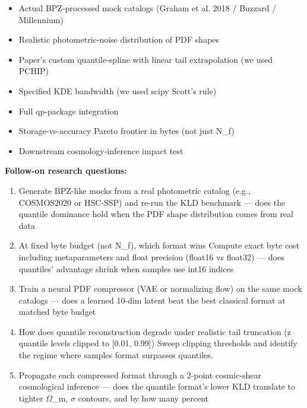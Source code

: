 \documentclass[11pt]{article}
\begin{document}
\begin{itemize}[leftmargin=1.4em,itemsep=0.2em,topsep=0.2em]
\item Actual BPZ-processed mock catalogs (Graham et al. 2018 / Buzzard / Millennium)
\item Realistic photometric-noise distribution of PDF shapes
\item Paper's custom quantile-spline with linear tail extrapolation (we used PCHIP)
\item Specified KDE bandwidth (we used scipy Scott's rule)
\item Full qp-package integration
\item Storage-vs-accuracy Pareto frontier in bytes (not just N\_f)
\item Downstream cosmology-inference impact test
\end{itemize}\noindent\textbf{Follow-on research questions:}
\begin{enumerate}[leftmargin=1.6em,itemsep=0.2em,topsep=0.2em,label=Q\arabic*.]
\item Generate BPZ-like mocks from a real photometric catalog (e.g., COSMOS2020 or HSC-SSP) and re-run the KLD benchmark --- does the quantile dominance hold when the PDF shape distribution comes from real data
\item At fixed byte budget (not N\_f), which format wins Compute exact byte cost including metaparameters and float precision (float16 vs float32) --- does quantiles' advantage shrink when samples use int16 indices
\item Train a neural PDF compressor (VAE or normalizing flow) on the same mock catalogs --- does a learned 10-dim latent beat the best classical format at matched byte budget
\item How does quantile reconstruction degrade under realistic tail truncation (z quantile levels clipped to [0.01, 0.99]) Sweep clipping thresholds and identify the regime where samples format surpasses quantiles.
\item Propagate each compressed format through a 2-point cosmic-shear cosmological inference --- does the quantile format's lower KLD translate to tighter $\Omega$\_m, $\sigma$ contours, and by how many percent
\end{enumerate}
\end{document}
